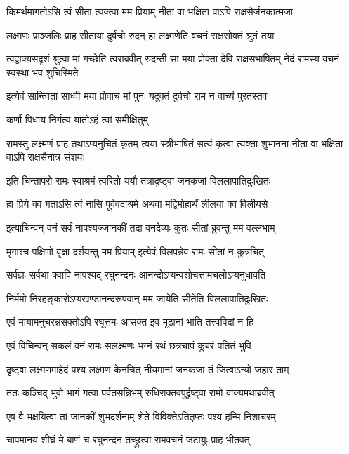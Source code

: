 \twolineshloka
{किमर्थमागतोऽसि त्वं सीतां त्यक्त्वा मम प्रियाम्}
{नीता वा भक्षिता वाऽपि राक्षसैर्जनकात्मजा} %

\twolineshloka
{लक्ष्मणः प्राञ्जलिः प्राह सीताया दुर्वचो रुदन्}
{हा लक्ष्मणेति वचनं राक्षसोक्तं श्रुतं तया} %

\threelineshloka
{त्वद्वाक्यसदृशं श्रुत्वा मां गच्छेति त्वराब्रवीत्}
{रुदन्ती सा मया प्रोक्ता देवि राक्षसभाषितम्}
{नेदं रामस्य वचनं स्वस्था भव शुचिस्मिते} %

\twolineshloka
{इत्येवं सान्त्विता साध्वी मया प्रोवाच मां पुनः}
{यदुक्तं दुर्वचो राम न वाच्यं पुरतस्तव} %

\onelineshloka
{कर्णौ पिधाय निर्गत्य यातोऽहं त्वां समीक्षितुम्} %


\threelineshloka
{रामस्तु लक्ष्मणं प्राह तथाऽप्यनुचितं कृतम्}
{त्वया स्त्रीभाषितं सत्यं कृत्वा त्यक्ता शुभानना}
{नीता वा भक्षिता वाऽपि राक्षसैर्नात्र संशयः} %

\twolineshloka
{इति चिन्तापरो रामः स्वाश्रमं त्वरितो ययौ}
{तत्रादृष्ट्वा जनकजां विललापातिदुःखितः} %

\twolineshloka
{हा प्रिये क्व गताऽसि त्वं नासि पूर्ववदाश्रमे}
{अथवा मद्विमोहार्थं लीलया क्व विलीयसे} %

\twolineshloka
{इत्याचिन्वन् वनं सर्वं नापश्यज्जानकीं तदा}
{वनदेव्यः कुतः सीतां ब्रुवन्तु मम वल्लभाम्} %

\twolineshloka
{मृगाश्च पक्षिणो वृक्षा दर्शयन्तु मम प्रियाम्}
{इत्येवं विलपन्नेव रामः सीतां न कुत्रचित्} %

\twolineshloka
{सर्वज्ञः सर्वथा क्वापि नापश्यद् रघुनन्दनः}
{आनन्दोऽप्यन्वशोचत्तामचलोऽप्यनुधावति} %

\twolineshloka
{निर्ममो निरहङ्कारोऽप्यखण्डानन्दरूपवान्}
{मम जायेति सीतेति विललापातिदुःखितः} %

\twolineshloka
{एवं मायामनुचरन्नसक्तोऽपि रघूत्तमः}
{आसक्त इव मूढानां भाति तत्त्वविदां न हि} %

\twolineshloka
{एवं विचिन्वन् सकलं वनं रामः सलक्ष्मणः}
{भग्नं रथं छत्रचापं कूबरं पतितं भुवि} %

\twolineshloka
{दृष्ट्वा लक्ष्मणमाहेदं पश्य लक्ष्मण केनचित्}
{नीयमानां जनकजां तं जित्वाऽन्यो जहार ताम्} %

\twolineshloka
{ततः कञ्चिद् भुवो भागं गत्वा पर्वतसन्निभम्}
{रुधिराक्तवपुर्दृष्ट्वा रामो वाक्यमथाब्रवीत्} %

\twolineshloka
{एष वै भक्षयित्वा तां जानकीं शुभदर्शनाम्}
{शेते विविक्तेऽतितृप्तः पश्य हन्मि निशाचरम्} %

\twolineshloka
{चापमानय शीघ्रं मे बाणं च रघुनन्दन}
{तच्छ्रुत्वा रामवचनं जटायुः प्राह भीतवत्} %

